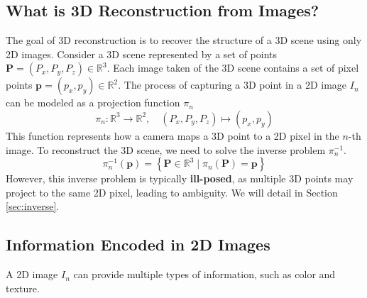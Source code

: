 \documentclass[12pt]{article}
\begin{document}
\subsection{What is 3D Reconstruction from Images?}
The goal of 3D reconstruction is to recover the structure of a 3D scene using only 2D images.
Consider a 3D scene represented by a set of points \( \mathbf{P} = (P_x, P_y, P_z) \in \mathbb{R}^3 \).
Each image taken of the 3D scene contains a set of pixel points \( \mathbf{p} = (p_x, p_y) \in \mathbb{R}^2 \).
The process of capturing a 3D point in a 2D image \( I_n \) can be modeled as a projection function \( \pi_n \)
\begin{equation}
\pi_n: \mathbb{R}^3 \to \mathbb{R}^2, \quad (P_x, P_y, P_z) \mapsto (p_x, p_y) \label{eq:proj}
\end{equation}
This function represents how a camera maps a 3D point to a 2D pixel in the \( n \)-th image.
To reconstruct the 3D scene, we need to solve the inverse problem \( \pi_n^{-1} \).
\begin{equation}
\pi_n^{-1}(\mathbf{p}) = \left\{ \mathbf{P} \in \mathbb{R}^3 \mid \pi_n(\mathbf{P}) = \mathbf{p} \right\} \label{eq:invproj}
\end{equation}
However, this inverse problem is typically \textbf{ill-posed}, as multiple 3D points may project to the same 2D pixel, leading to ambiguity. We will detail in Section \ref{sec:inverse}.

\subsection{Information Encoded in 2D Images}
A 2D image \( I_n \) can provide multiple types of information, such as color and texture.
\end{document}
